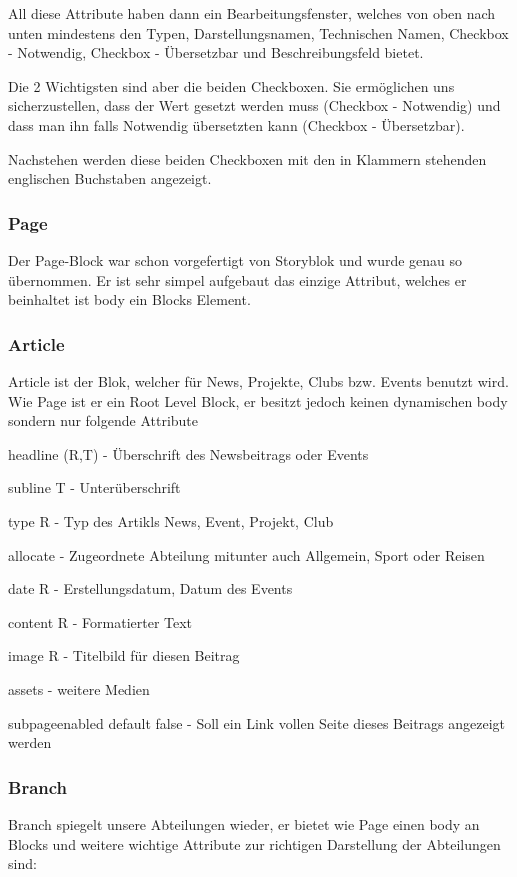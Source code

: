 All diese Attribute haben dann ein Bearbeitungsfenster, welches von oben nach unten mindestens den Typen, Darstellungsnamen, Technischen Namen, Checkbox - Notwendig, Checkbox - Übersetzbar und Beschreibungsfeld bietet.

Die 2 Wichtigsten sind aber die beiden Checkboxen. Sie ermöglichen uns sicherzustellen, dass der Wert gesetzt werden muss (Checkbox - Notwendig) und dass man ihn falls Notwendig übersetzten kann (Checkbox - Übersetzbar). 

Nachstehen werden diese beiden Checkboxen mit den in Klammern stehenden englischen Buchstaben angezeigt.

\subsubsection*{Page}
Der Page-Block war schon vorgefertigt von Storyblok und wurde genau so übernommen.
Er ist sehr simpel aufgebaut das einzige Attribut, welches er beinhaltet ist body ein Blocks Element.

\subsubsection*{Article}
Article ist der Blok, welcher für News, Projekte, Clubs bzw. Events benutzt wird. 
Wie Page ist er ein Root Level Block, er besitzt jedoch keinen dynamischen body sondern nur folgende Attribute

headline (R,T) - Überschrift des Newsbeitrags oder Events 

subline T - Unterüberschrift

type R -  Typ des Artikls News, Event, Projekt, Club

allocate - Zugeordnete Abteilung mitunter auch Allgemein, Sport oder Reisen

date R - Erstellungsdatum, Datum des Events

content R - Formatierter Text

image R - Titelbild für diesen Beitrag

assets - weitere Medien

subpage\textunderscore enabled default false - Soll ein Link vollen Seite dieses Beitrags angezeigt werden

\subsubsection*{Branch}
Branch spiegelt unsere Abteilungen wieder, er bietet wie Page einen body an Blocks und weitere wichtige Attribute zur richtigen Darstellung der Abteilungen sind:

